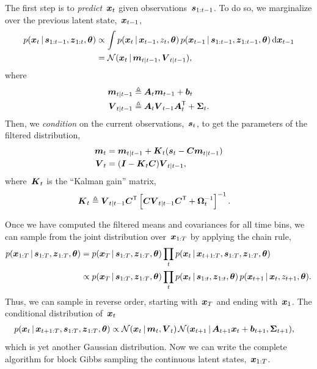 The first step is to \emph{predict}~$\boldsymbol{x}_t$ given observations~$\boldsymbol{s}_{1:t-1}$.
To do so, we marginalize over the previous latent state,~$\boldsymbol{x}_{t-1}$,
\begin{align*}
  p(\boldsymbol{x}_t \,|\, \boldsymbol{s}_{1:t-1}, \boldsymbol{z}_{1:t}, \boldsymbol{\theta})
  &\propto  \int p(\boldsymbol{x}_t \,|\, \boldsymbol{x}_{t-1}, z_{t}, \boldsymbol{\theta}) \, 
    p(\boldsymbol{x}_{t-1} \,|\, \boldsymbol{s}_{1:t-1}, \boldsymbol{z}_{1:t-1}, \boldsymbol{\theta}) \, \mathrm{d} \boldsymbol{x}_{t-1} \\
  &= \mathcal{N}(\boldsymbol{x}_t \,|\, \boldsymbol{m}_{t|t-1}, \boldsymbol{V}_{t|t-1}),
\end{align*}
where
\begin{align*}
  \boldsymbol{m}_{t|t-1} &\triangleq \boldsymbol{A}_t \boldsymbol{m}_{t-1} + \boldsymbol{b}_t \\
  \boldsymbol{V}_{t|t-1} &\triangleq \boldsymbol{A}_t \boldsymbol{V}_{t-1}\boldsymbol{A}_t^{\mathsf{T}} + \boldsymbol{\Sigma}_t.
\end{align*}
Then, we \emph{condition} on the current observations,~$\boldsymbol{s}_t$, to get the
parameters of the filtered distribution,
\begin{align}
  \nonumber
  \boldsymbol{m}_t &= \boldsymbol{m}_{t|t-1} + \boldsymbol{K}_t (\boldsymbol{s}_t - \boldsymbol{C} \boldsymbol{m}_{t|t-1}) \\
  \label{eq:kalman_filter}
  \boldsymbol{V}_t &= (\boldsymbol{I} - \boldsymbol{K}_t \boldsymbol{C}) \boldsymbol{V}_{t|t-1},
\end{align}
where~$\boldsymbol{K}_t$ is the ``Kalman gain'' matrix,
\begin{align*}
  \boldsymbol{K}_t &\triangleq \boldsymbol{V}_{t|t-1} \boldsymbol{C}^{\mathsf{T}} \left[ \boldsymbol{C} \boldsymbol{V}_{t|t-1} \boldsymbol{C}^{\mathsf{T}} + \boldsymbol{\Omega}_t^{-1} \right]^{-1}.
\end{align*}

Once we have computed the filtered means and covariances for all
time bins, we can sample from the joint distribution over~$\boldsymbol{x}_{1:T}$
by applying the chain rule,
\begin{align*}
  p(\boldsymbol{x}_{1:T} \,|\, \boldsymbol{s}_{1:T}, \boldsymbol{z}_{1:T}, \boldsymbol{\theta})
  &= p(\boldsymbol{x}_T \,|\, \boldsymbol{s}_{1:T}, \boldsymbol{z}_{1:T}, \boldsymbol{\theta})
  \prod_{t} p(\boldsymbol{x}_{t} \,|\, \boldsymbol{x}_{t+1:T}, \boldsymbol{s}_{1:T}, \boldsymbol{z}_{1:T}, \boldsymbol{\theta}) \\
  &\propto p(\boldsymbol{x}_T \,|\, \boldsymbol{s}_{1:T}, \boldsymbol{z}_{1:T}, \boldsymbol{\theta})
  \prod_{t} p(\boldsymbol{x}_t \,|\, \boldsymbol{s}_{1:t}, \boldsymbol{z}_{1:t}, \boldsymbol{\theta}) \, 
    p(\boldsymbol{x}_{t+1} \,|\, \boldsymbol{x}_{t}, z_{t+1}, \boldsymbol{\theta}).
\end{align*}
Thus, we can sample in reverse order, starting with~$\boldsymbol{x}_T$ and ending
with~$\boldsymbol{x}_1$. The conditional distribution of~${\boldsymbol{x}_t}$
\begin{align}
  \label{eq:bkwd_sample}
  p(\boldsymbol{x}_t \,|\, \boldsymbol{x}_{t+1:T}, \boldsymbol{s}_{1:T}, \boldsymbol{z}_{1:T}, \boldsymbol{\theta})
  &\propto
  \mathcal{N}(\boldsymbol{x}_t \,|\, \boldsymbol{m}_t, \boldsymbol{V}_t) \,
  \mathcal{N}(\boldsymbol{x}_{t+1} \,|\, \boldsymbol{A}_{t+1}\boldsymbol{x}_{t} + \boldsymbol{b}_{t+1}, \boldsymbol{\Sigma}_{t+1}),
\end{align}
which is yet another Gaussian distribution. Now we can write the complete 
algorithm for block Gibbs sampling the continuous latent states,~$\boldsymbol{x}_{1:T}$.

